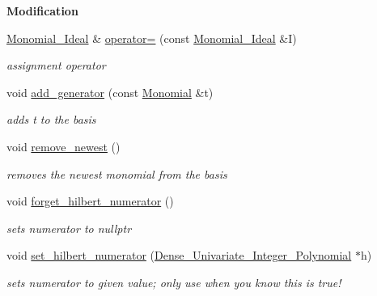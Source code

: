 \begin{Indent}\textbf{ Modification}\par
\begin{DoxyCompactItemize}
\item 
\mbox{\label{group__polygroup_a6c98e802ae88111ff5f4c9b5e57a991c}} 
\hyperlink{group__polygroup_class_monomial___ideal}{Monomial\+\_\+\+Ideal} \& \hyperlink{group__polygroup_a6c98e802ae88111ff5f4c9b5e57a991c}{operator=} (const \hyperlink{group__polygroup_class_monomial___ideal}{Monomial\+\_\+\+Ideal} \&I)
\begin{DoxyCompactList}\small\item\em assignment operator \end{DoxyCompactList}\item 
\mbox{\label{group__polygroup_a10135daadd19fbd37cde2c1109eaf26d}} 
void \hyperlink{group__polygroup_a10135daadd19fbd37cde2c1109eaf26d}{add\+\_\+generator} (const \hyperlink{group__polygroup_class_monomial}{Monomial} \&t)
\begin{DoxyCompactList}\small\item\em adds {\ttfamily t} to the basis \end{DoxyCompactList}\item 
\mbox{\label{group__polygroup_a5410d31236ca04dfca3fe27acb7553f4}} 
void \hyperlink{group__polygroup_a5410d31236ca04dfca3fe27acb7553f4}{remove\+\_\+newest} ()
\begin{DoxyCompactList}\small\item\em removes the newest monomial from the basis \end{DoxyCompactList}\item 
\mbox{\label{group__polygroup_a5653fee1985ec45e11c594d7de53385b}} 
void \hyperlink{group__polygroup_a5653fee1985ec45e11c594d7de53385b}{forget\+\_\+hilbert\+\_\+numerator} ()
\begin{DoxyCompactList}\small\item\em sets numerator to {\ttfamily nullptr} \end{DoxyCompactList}\item 
\mbox{\label{group__polygroup_ab0c510ed85328199cce722831143165e}} 
void \hyperlink{group__polygroup_ab0c510ed85328199cce722831143165e}{set\+\_\+hilbert\+\_\+numerator} (\hyperlink{group__polygroup_class_dense___univariate___integer___polynomial}{Dense\+\_\+\+Univariate\+\_\+\+Integer\+\_\+\+Polynomial} $\ast$h)
\begin{DoxyCompactList}\small\item\em sets numerator to given value; only use when you know this is true! \end{DoxyCompactList}\end{DoxyCompactItemize}
\end{Indent}
